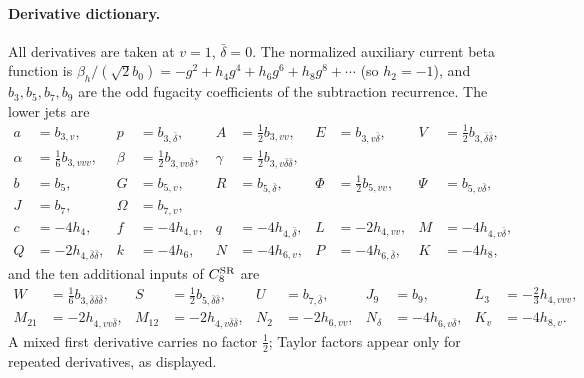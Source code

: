 \documentclass[11pt,a4paper]{article}
\numberwithin{equation}{section}
\newcommand{\CSR}{C^{\rm SR}}
\newcommand{\db}{\bar\delta}
\begin{document}
\paragraph{Derivative dictionary.} All derivatives are taken at $v=1$, $\db=0$. The normalized auxiliary current
beta function is $\beta_h/(\sqrt2b_0)=-g^2+h_4g^4+h_6g^6+h_8g^8+\cdots$ (so $h_2=-1$), and $b_3,b_5,b_7,b_9$ are the odd
fugacity coefficients of the subtraction recurrence. The lower jets are
\begin{equation}
\begin{aligned}
 a&=b_{3,v}, & p&=b_{3,\db}, & A&=\tfrac12b_{3,vv}, & E&=b_{3,v\db}, & V&=\tfrac12b_{3,\db\db},\\
 \alpha&=\tfrac16b_{3,vvv}, & \beta&=\tfrac12b_{3,vv\db}, & \gamma&=\tfrac12b_{3,v\db\db}, && &&\\
 b&=b_5, & G&=b_{5,v}, & R&=b_{5,\db}, & \Phi&=\tfrac12b_{5,vv}, & \Psi&=b_{5,v\db},\\
 J&=b_7, & \Omega&=b_{7,v}, &&&&&&\\
 c&=-4h_4, & f&=-4h_{4,v}, & q&=-4h_{4,\db}, & L&=-2h_{4,vv}, & M&=-4h_{4,v\db},\\
 Q&=-2h_{4,\db\db}, & k&=-4h_6, & N&=-4h_{6,v}, & P&=-4h_{6,\db}, & K&=-4h_8,
\end{aligned}
\end{equation}
and the ten additional inputs of $\CSR_8$ are
\begin{equation}
\begin{aligned}
 W&=\tfrac16b_{3,\db\db\db}, & S&=\tfrac12b_{5,\db\db}, & U&=b_{7,\db}, & J_9&=b_9, & L_3&=-\tfrac23h_{4,vvv},\\
 M_{21}&=-2h_{4,vv\db}, & M_{12}&=-2h_{4,v\db\db}, & N_2&=-2h_{6,vv}, & N_\delta&=-4h_{6,v\db}, & K_v&=-4h_{8,v}.
\end{aligned}
\end{equation}
A mixed first derivative carries no factor $\frac12$; Taylor factors appear only for repeated derivatives, as
displayed.
\end{document}
